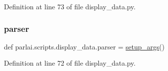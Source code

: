 Definition at line 73 of file display\+\_\+data.\+py.

\mbox{\label{namespaceparlai_1_1scripts_1_1display__data_a5fa87e5f2fd5df26d1eac44bd92cf31e}} 
\subsubsection{\texorpdfstring{parser}{parser}}
{\footnotesize\ttfamily def parlai.\+scripts.\+display\+\_\+data.\+parser = \hyperlink{namespaceparlai_1_1scripts_1_1display__data_a666e6177939b9a63961e56a1dfdc74b4}{setup\+\_\+args}()}



Definition at line 72 of file display\+\_\+data.\+py.

